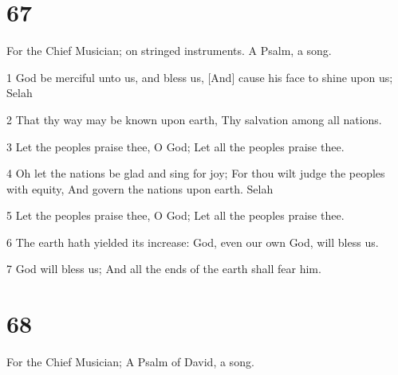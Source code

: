 \chapter{67}

\par For the Chief Musician; on stringed instruments. A Psalm, a song.

\par 1 God be merciful unto us, and bless us, [And] cause his face to shine upon us; Selah
\par 2 That thy way may be known upon earth, Thy salvation among all nations.
\par 3 Let the peoples praise thee, O God; Let all the peoples praise thee.
\par 4 Oh let the nations be glad and sing for joy; For thou wilt judge the peoples with equity, And govern the nations upon earth. Selah
\par 5 Let the peoples praise thee, O God; Let all the peoples praise thee.
\par 6 The earth hath yielded its increase: God, even our own God, will bless us.
\par 7 God will bless us; And all the ends of the earth shall fear him.

\chapter{68}

\par For the Chief Musician; A Psalm of David, a song.


